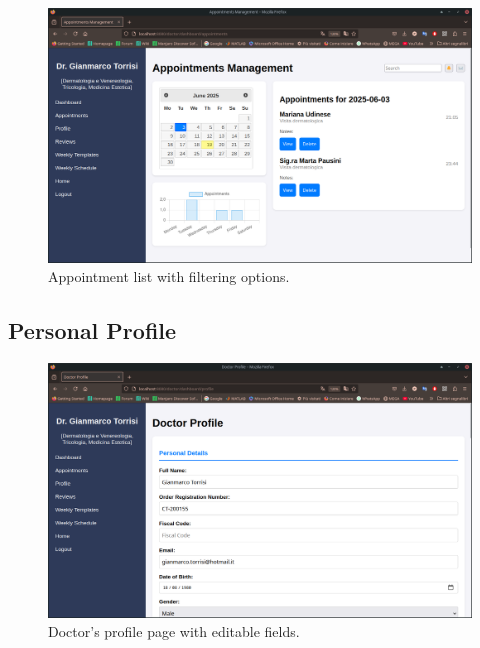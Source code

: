 \begin{figure}[!h]
	\centering
	\includegraphics[scale=0.30]{resources/screenshots/doctor_ui/appointments.png}
	\caption{Appointment list with filtering options.}
	\label{fig:appointment_list}
\end{figure}

\subsection{Personal Profile}

\begin{figure}[!h]
	\centering
	\includegraphics[scale=0.30]{resources/screenshots/doctor_ui/personal_info.png}
	\caption{Doctor's profile page with editable fields.}
	\label{fig:doctor_profile}
\end{figure}

